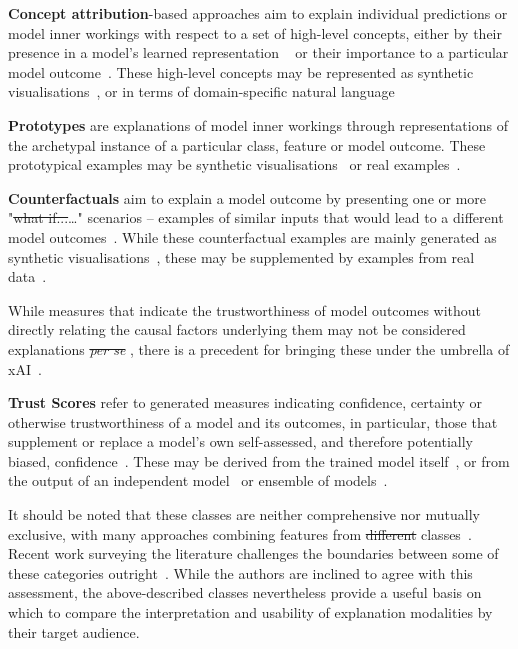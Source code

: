 \documentclass[final,5p,times,twocolumn,hyphens]{elsarticle}
\providecommand{\DIFaddtex}[1]{{\protect\color{blue}\uwave{#1}}} %
\providecommand{\DIFdeltex}[1]{{\protect\color{red}\sout{#1}}}                      %
\providecommand{\DIFaddbegin}{} %
\providecommand{\DIFaddend}{} %
\providecommand{\DIFdelbegin}{} %
\providecommand{\DIFdelend}{} %
\providecommand{\DIFadd}[1]{\texorpdfstring{\DIFaddtex{#1}}{#1}} %
\providecommand{\DIFdel}[1]{\texorpdfstring{\DIFdeltex{#1}}{}} %
\newcommand{\DIFscaledelfig}{0.5}
\newlength{\DIFdelgraphicswidth} %
\newlength{\DIFdelgraphicsheight} %
\newcommand{\DIFaddincludegraphics}[2][]{{\color{blue}\fbox{\DIFOincludegraphics[#1]{#2}}}} %
\newcommand{\DIFdelincludegraphics}[2][]{%
\sbox{\DIFdelgraphicsbox}{\DIFOincludegraphics[#1]{#2}}%
\settoboxwidth{\DIFdelgraphicswidth}{\DIFdelgraphicsbox} %
\settoboxtotalheight{\DIFdelgraphicsheight}{\DIFdelgraphicsbox} %
\scalebox{\DIFscaledelfig}{%
\parbox[b]{\DIFdelgraphicswidth}{\usebox{\DIFdelgraphicsbox}\\[-\baselineskip] \rule{\DIFdelgraphicswidth}{0em}}\llap{\resizebox{\DIFdelgraphicswidth}{\DIFdelgraphicsheight}{%
\setlength{\unitlength}{\DIFdelgraphicswidth}%
\begin{picture}(1,1)%
\thicklines\linethickness{2pt} %
{\color[rgb]{1,0,0}\put(0,0){\framebox(1,1){}}}%
{\color[rgb]{1,0,0}\put(0,0){\line( 1,1){1}}}%
{\color[rgb]{1,0,0}\put(0,1){\line(1,-1){1}}}%
\end{picture}%
}\hspace*{3pt}}} %
} %
\DeclareRobustCommand{\DIFaddbegin}{\DIFOaddbegin \let\includegraphics\DIFaddincludegraphics} %
\DeclareRobustCommand{\DIFaddend}{\DIFOaddend \let\includegraphics\DIFOincludegraphics} %
\DeclareRobustCommand{\DIFdelbegin}{\DIFOdelbegin \let\includegraphics\DIFdelincludegraphics} %
\DeclareRobustCommand{\DIFdelend}{\DIFOaddend \let\includegraphics\DIFOincludegraphics} %
\begin{document}
\textbf{Concept attribution}-based approaches aim to explain individual predictions or model inner workings with respect to a set of high-level concepts, either by their presence in a model's learned representation ~\cite{GrazianiHenning:2020:ConceptAttribution} or their importance to a particular model outcome~\cite{kim2018interpretability}. These high-level concepts may be represented as synthetic visualisations~\cite{erhan2009visualizing, yosinski2015deepvisualization}, or in terms of domain-specific natural language~\cite{GrazianiHenning:2020:ConceptAttribution, kim2018interpretability} 

\textbf{Prototypes} are explanations of model inner workings through representations of the archetypal instance of a particular class, feature or model outcome. These prototypical examples may be synthetic visualisations~\cite{li2018deep} or real examples~\cite{kim2016examples}.

\textbf{Counterfactuals} aim to explain a model outcome by presenting one or more "\DIFdelbegin \DIFdel{what if...}\DIFdelend \DIFaddbegin \DIFadd{What if}\dots\DIFadd{?}\DIFaddend " scenarios -- examples of similar inputs that would lead to a different model outcomes~\cite{ginsberg1986counterfactuals}. While these counterfactual examples are mainly generated as synthetic visualisations~\cite{seah2019chest, poceviciute_survey_2020, liu2019generative}, these may be supplemented by examples from real data~\cite{gulshad2021counterfactual}.

While measures that indicate the trustworthiness of model outcomes without directly relating the causal factors underlying them may not be considered explanations \DIFdelbegin \textit{\DIFdel{per se}}%
\DIFdelend \DIFaddbegin \DIFadd{per se}\DIFaddend , there is a precedent for bringing these under the umbrella of xAI~\cite{poceviciute_survey_2020, lin2019explanations}.

\textbf{Trust Scores} refer to generated measures indicating confidence, certainty or otherwise trustworthiness of a model and its outcomes, in particular, those that supplement or replace a model's own self-assessed, and therefore potentially biased, confidence~\cite{jiang2018trust, wang2021ai}. These may be derived from the trained model itself~\cite{tagasovska2019single}, or from the output of an independent model~\cite{jiang2018trust} or ensemble of models~\cite{pearce2018high}.

It should be noted that these classes are neither comprehensive nor mutually exclusive, with many \DIFaddbegin \DIFadd{promising }\DIFaddend approaches combining features from \DIFdelbegin \DIFdel{different }\DIFdelend \DIFaddbegin \DIFadd{multiple }\DIFaddend classes~\cite{kim2016examples,liu2019generative}. Recent work surveying the literature challenges the boundaries between some of these categories outright~\cite{zhang2021survey}. While the authors are inclined to agree with this assessment, the above-described classes nevertheless provide a useful basis on which to compare the interpretation and usability of explanation modalities by their target audience.
\end{document}

